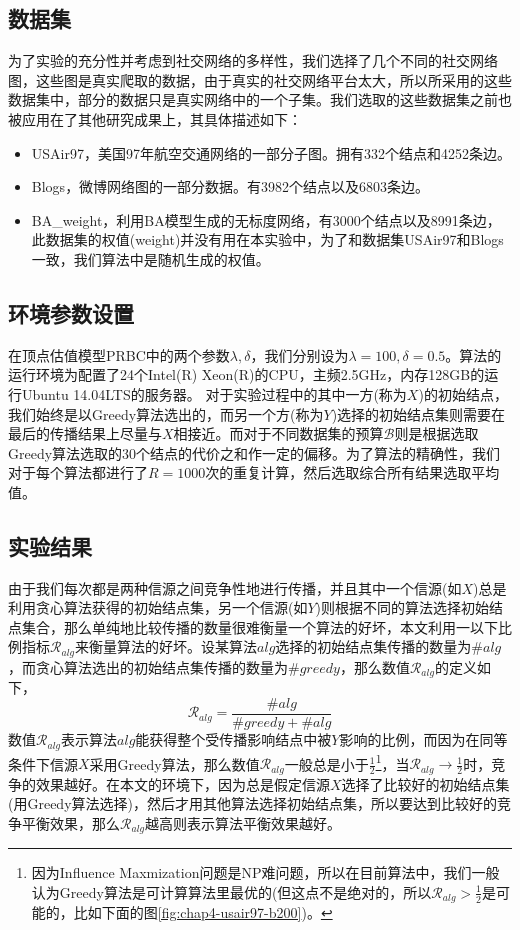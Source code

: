 \subsection{数据集}
\label{sec:chap4-exp-datasets}
为了实验的充分性并考虑到社交网络的多样性，我们选择了几个不同的社交网络图，这些图是真实爬取的数据，由于真实的社交网络平台太大，所以所采用的这些数据集中，部分的数据只是真实网络中的一个子集。我们选取的这些数据集之前也被应用在了其他研究成果上，其具体描述如下：
\begin{itemize}
\item USAir97\cite{batagelj2009pajek}，美国97年航空交通网络的一部分子图。拥有332个结点和4252条边。
\item Blogs\cite{xie2006social}，微博网络图的一部分数据。有3982个结点以及6803条边。
\item BA\_weight，利用BA模型生成的无标度网络，有3000个结点以及8991条边，此数据集的权值(weight)并没有用在本实验中，为了和数据集USAir97和Blogs一致，我们算法中是随机生成的权值。
\end{itemize}

\subsection{环境参数设置}
\label{sec:chap4-exp-setup}
在顶点估值模型PRBC中的两个参数$\lambda,\delta$，我们分别设为$\lambda=100,\delta=0.5$。算法的运行环境为配置了24个Intel(R) Xeon(R)的CPU，主频2.5GHz，内存128GB的运行Ubuntu 14.04LTS的服务器。
对于实验过程中的其中一方(称为$X$)的初始结点，我们始终是以Greedy算法选出的，而另一个方(称为$Y$)选择的初始结点集则需要在最后的传播结果上尽量与$X$相接近。而对于不同数据集的预算$\mathcal{B}$则是根据选取Greedy算法选取的30个结点的代价之和作一定的偏移。为了算法的精确性，我们对于每个算法都进行了$R=1000$次的重复计算，然后选取综合所有结果选取平均值。

\subsection{实验结果}
\label{sec:chap4-exp-results}
由于我们每次都是两种信源之间竞争性地进行传播，并且其中一个信源(如$X$)总是利用贪心算法获得的初始结点集，另一个信源(如$Y$)则根据不同的算法选择初始结点集合，那么单纯地比较传播的数量很难衡量一个算法的好坏，本文利用一以下比例指标$\mathcal{R}_{alg}$来衡量算法的好坏。设某算法$alg$选择的初始结点集传播的数量为$\#alg$，而贪心算法选出的初始结点集传播的数量为$\#greedy$，那么数值$\mathcal{R}_{alg}$的定义如下，
\begin{displaymath}
\mathcal{R}_{alg}=\frac{\#alg}{\#greedy+\#alg}
\end{displaymath}
数值$\mathcal{R}_{alg}$表示算法$alg$能获得整个受传播影响结点中被$Y$影响的比例，而因为在同等条件下信源$X$采用Greedy算法，那么数值$\mathcal{R}_{alg}$一般总是小于$\frac{1}{2}$\footnote{因为Influence Maxmization问题是NP难问题，所以在目前算法中，我们一般认为Greedy算法是可计算算法里最优的(但这点不是绝对的，所以$\mathcal{R}_{alg} > \frac{1}{2}$是可能的，比如下面的图\ref{fig:chap4-usair97-b200})。}，当$\mathcal{R}_{alg} \rightarrow \frac{1}{2}$时，竞争的效果越好。在本文的环境下，因为总是假定信源$X$选择了比较好的初始结点集(用Greedy算法选择)，然后才用其他算法选择初始结点集，所以要达到比较好的竞争平衡效果，那么$\mathcal{R}_{alg}$越高则表示算法平衡效果越好。

